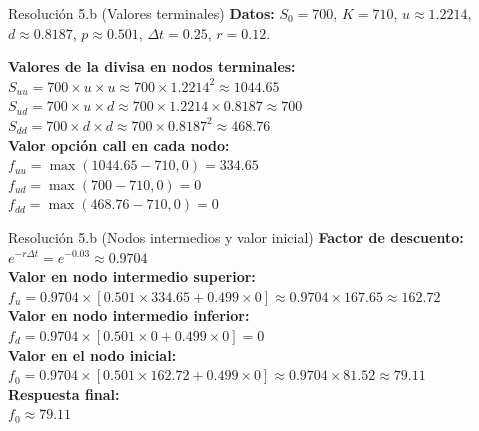 \documentclass{beamer}
\begin{document}
\begin{frame}{Resolución 5.b (Valores terminales)}
\justify
\textbf{Datos:} $S_0 = 700$, $K = 710$, $u \approx 1.2214$, $d \approx 0.8187$, $p \approx 0.501$, $\Delta t = 0.25$, $r = 0.12$.

\vspace{0.5em}
\textbf{Valores de la divisa en nodos terminales:} \\
$S_{uu} = 700 \times u \times u \approx 700 \times 1.2214^2 \approx 1044.65$ \\
$S_{ud} = 700 \times u \times d \approx 700 \times 1.2214 \times 0.8187 \approx 700$ \\
$S_{dd} = 700 \times d \times d \approx 700 \times 0.8187^2 \approx 468.76$ \\

\vspace{0.5em}
\textbf{Valor opción call en cada nodo:} \\
$f_{uu} = \max(1044.65 - 710, 0) = 334.65$ \\
$f_{ud} = \max(700 - 710, 0) = 0$ \\
$f_{dd} = \max(468.76 - 710, 0) = 0$
\end{frame}

\begin{frame}{Resolución 5.b (Nodos intermedios y valor inicial)}
\justify
\textbf{Factor de descuento:} $e^{-r\Delta t} = e^{-0.03} \approx 0.9704$ \\

\textbf{Valor en nodo intermedio superior:} \\
$f_u = 0.9704 \times [0.501 \times 334.65 + 0.499 \times 0] \approx 0.9704 \times 167.65 \approx 162.72$ \\

\textbf{Valor en nodo intermedio inferior:} \\
$f_d = 0.9704 \times [0.501 \times 0 + 0.499 \times 0] = 0$ \\

\textbf{Valor en el nodo inicial:} \\
$f_0 = 0.9704 \times [0.501 \times 162.72 + 0.499 \times 0] \approx 0.9704 \times 81.52 \approx 79.11$ \\

\vspace{0.5em}
\textbf{Respuesta final:} \\
$f_0 \approx 79.11$
\end{frame}
\end{document}
